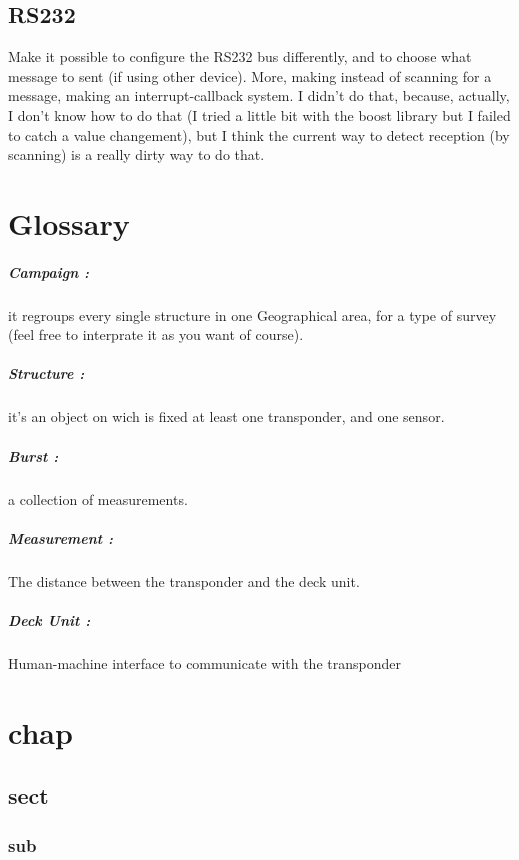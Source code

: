 \documentclass[11pt]{report}
\begin{document}
	    \section{RS232}
		Make it possible to configure the RS232 bus differently, and to choose what message to sent (if using other device).
		More, making instead of scanning for a message, making an interrupt-callback system. I didn't do that, because, actually, 
		I don't know how to do that (I tried a little bit with the boost library but I failed to catch a value changement), but 
		I think the current way to detect reception (by scanning) is a really dirty way to do that.


	\chapter{Glossary}
	    \paragraph{Campaign :} it regroups every single structure in one Geographical area, for a type of survey (feel free to 
	    interprate it as you want of course).
	    \paragraph{Structure :} it's an object on wich is fixed at least one transponder, and one sensor.
	    \paragraph{Burst :} a collection of measurements.
	    \paragraph{Measurement :} The distance between the transponder and the deck unit.
	    \paragraph{Deck Unit :} Human-machine interface to communicate with the transponder

\iffalse		
\chapter{chap}
	\section{sect}
		\subsection{sub}
		\begin{itemize}
		\end{itemize}
		
\end{document}
